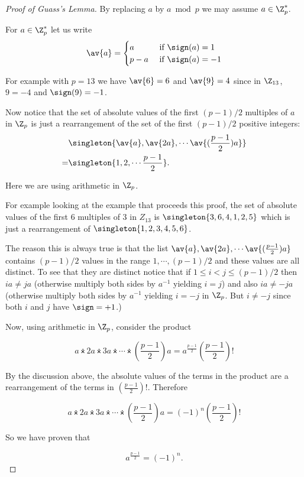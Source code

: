 \documentclass[oneside,12pt]{amsart}
\begin{document}
\begin{proof}[Proof of Guass's Lemma]
By replacing $a$ by $a\bmod p$ we may assume $a\in\Z^*_p$.

For $a\in\Z^*_p$ let us write 
$$\av{a}=
\begin{cases}
a &\text{ if } \sign(a) = 1 \\
p-a &\text{ if } \sign(a) = -1
\end{cases}
$$

For example with $p=13$ we have $\av{6} = 6$ and $\av{9}=4$ since in $\Z_{13}$, $9=-4$ and $\sign(9)=-1$.

Now notice that the set of absolute values of the first $(p-1)/2$ multiples of $a$ in $\Z_p$ is just a rearrangement
of the set of the first $(p-1)/2$ positive integers:
\begin{align*}
&\singleton{\av{a},\av{2a}, \cdots \av{(\frac{p-1}{2})a}} \\
= &\singleton{1,2,\cdots \frac{p-1}{2}}.
\end{align*}

Here we are using arithmetic in $\Z_p$.

For example looking at the example that proceeds this proof, the set of absolute values of the first 6 multiples
of 3 in $Z_{13}$ is $\singleton{3,6,4,1,2,5}$ which is just a rearrangement of $\singleton{1,2,3,4,5,6}$.

The reason this is always true is that the list $\av{a},\av{2a}, \cdots \av{(\frac{p-1}{2})a}$ contains $(p-1)/2$ values in the
range $1,\cdots, (p-1)/2$ and these values are all distinct. To see that they are distinct notice that
if $1\leq i<j\leq (p-1)/2$ then $ia\not= ja$ (otherwise multiply both sides by $a^{-1}$ yielding $i=j$) and also $ia\not=-ja$
(otherwise multiply both sides by $a^{-1}$ yielding $i=-j$ in $\Z_p$. But $i\not=-j$ since both $i$ and $j$ have $\sign=+1$.)

Now, using arithmetic in $\Z_p$, consider the product

$$ 
a \dottimes 2a \dottimes 3a \dottimes \cdots \dottimes \left(\frac{p-1}{2}\right)a = a^{\frac{p-1}{2}}\left(\frac{p-1}{2} \right)!
$$

By the discussion above, the absolute values of the terms in the product are a rearrangement of the terms in $\left(\frac{p-1}{2} \right)!$. Therefore

$$ 
a \dottimes 2a \dottimes 3a \dottimes \cdots \dottimes (\frac{p-1}{2})a = (-1)^n\left(\frac{p-1}{2} \right)!
$$

So we have proven that

$$
a^{\frac{p-1}{2}} = (-1)^n.
$$

\end{proof}
\end{document}
